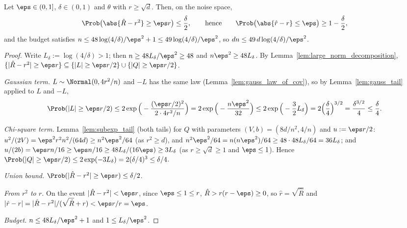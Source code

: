 \begin{theorem}\label{thm:large_norm_guarantee}
\leanok
{}
Let $\eps \in (0,1]$, $\delta \in (0,1)$ and $\theta$ with $r \ge \sqrt d$. Then, on the noise
space,
\[
  \Prob\big( \abs{\hat R - r^2} \ge \eps r \big) \le \frac{\delta}{2},
  \qquad\text{hence}\qquad
  \Prob\big( \abs{\hat r - r} \le \eps \big) \ge 1 - \frac{\delta}{2},
\]
and the budget satisfies $n \le 48\log(4/\delta)/\eps^2 + 1 \le 49\log(4/\delta)/\eps^2$,
so $dn \le 49\,d\log(4/\delta)/\eps^2$.
\end{theorem}

\begin{proof}
\leanok
{}
Write $L_\delta := \log(4/\delta) > 1$; then $n \ge 48L_\delta/\eps^2 \ge 48$ and
$n\eps^2 \ge 48L_\delta$. By Lemma~\ref{lem:large_norm_decomposition},
$\{|\hat R - r^2| \ge \eps r\} \subseteq \{|L| \ge \eps r/2\} \cup \{|Q| \ge \eps r/2\}$.

\emph{Gaussian term.} $L \sim \Normal(0, 4r^2/n)$ and $-L$ has the same law
(Lemma~\ref{lem:gauss_law_of_cov}), so by Lemma~\ref{lem:gauss_tail} applied to $L$ and $-L$,
\[
  \Prob(|L| \ge \eps r/2) \le 2\exp\Big( -\frac{(\eps r/2)^2}{2\cdot 4r^2/n} \Big)
  = 2\exp\Big( -\frac{n\eps^2}{32} \Big)
  \le 2\exp\Big( -\frac{3}{2}L_\delta \Big) = 2\Big(\frac{\delta}{4}\Big)^{3/2}
  = \frac{\delta^{3/2}}{4} \le \frac{\delta}{4}.
\]

\emph{Chi-square term.} Lemma~\ref{lem:subexp_tail} (both tails) for $Q$ with parameters
$(V,b) = (8d/n^2, 4/n)$ and $u := \eps r/2$:
$u^2/(2V) = \eps^2r^2n^2/(64d) \ge n^2\eps^2/64$ (as $r^2 \ge d$), and
$n^2\eps^2/64 = n(n\eps^2)/64 \ge 48\cdot 48 L_\delta/64 = 36L_\delta$; and
$u/(2b) = \eps r n/16 \ge \eps n/16 \ge 48L_\delta/(16\eps) \ge 3L_\delta$ (as
$r \ge \sqrt d \ge 1$ and $\eps \le 1$). Hence
$\Prob(|Q| \ge \eps r/2) \le 2\exp(-3L_\delta) = 2(\delta/4)^3 \le \delta/4$.

\emph{Union bound.} $\Prob(|\hat R - r^2| \ge \eps r) \le \delta/2$.

\emph{From $r^2$ to $r$.} On the event $|\hat R - r^2| < \eps r$, since $\eps \le 1 \le r$,
$\hat R > r(r - \eps) \ge 0$, so $\hat r = \sqrt{\hat R}$ and
$|\hat r - r| = |\hat R - r^2|/(\sqrt{\hat R} + r) < \eps r/r = \eps$.

\emph{Budget.} $n \le 48L_\delta/\eps^2 + 1$ and $1 \le L_\delta/\eps^2$.
\end{proof}

